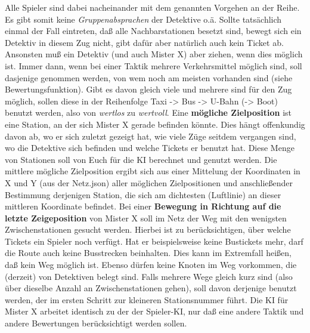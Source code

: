         Alle Spieler sind dabei nacheinander mit dem genannten Vorgehen an der Reihe.
        Es gibt somit keine \textit{Gruppenabsprachen} der Detektive o.ä. Sollte tatsächlich einmal der Fall eintreten, daß alle Nachbarstationen besetzt sind, bewegt sich ein Detektiv in diesem Zug nicht, gibt dafür aber natürlich auch kein Ticket ab.
        Ansonsten muß ein Detektiv (und auch Mister X) aber ziehen, wenn dies möglich ist.
        \newline
        \newline
        Immer dann, wenn bei einer Taktik mehrere Verkehrsmittel möglich sind, soll dasjenige genommen werden, von wem noch am meisten vorhanden sind (siehe Bewertungsfunktion).
        Gibt es davon gleich viele und mehrere sind für den Zug möglich, sollen diese in der Reihenfolge Taxi -> Bus -> U-Bahn (-> Boot) benutzt werden, also von \textit{wertlos} zu \textit{wertvoll}. 
        \newline
        \newline
        Eine \textbf{mögliche Zielposition} ist eine Station, an der sich Mister X gerade befinden könnte.
        Dies hängt offenkundig davon ab, wo er sich zuletzt gezeigt hat, wie viele Züge seitdem vergangen sind, wo die Detektive sich befinden und welche Tickets er benutzt hat.
        Diese Menge von Stationen soll von Euch für die KI berechnet und genutzt werden. Die mittlere mögliche Zielposition ergibt sich aus einer Mittelung der Koordinaten in X und Y (aus der Netz.json) aller möglichen Zielpositionen und anschließender Bestimmung derjenigen Station, die sich am dichtesten (Luftlinie) an dieser mittleren Koordinate befindet. 
        \newline
        \newline
        Bei einer \textbf{Bewegung in Richtung auf die letzte Zeigeposition} von Mister X soll im Netz der Weg mit den wenigsten Zwischenstationen gesucht werden.
        Hierbei ist zu berücksichtigen, über welche Tickets ein Spieler noch verfügt. Hat er beispielsweise keine Bustickets mehr, darf die Route auch keine Busstrecken beinhalten. Dies kann im Extremfall heißen, daß kein Weg möglich ist.
        Ebenso dürfen keine Knoten im Weg vorkommen, die (derzeit) von Detektiven belegt sind. Falls mehrere Wege gleich kurz sind (also über dieselbe Anzahl an Zwischenstationen gehen), soll davon derjenige benutzt werden, der im ersten Schritt zur kleineren Stationsnummer führt. 
        \newline
        \newline
        Die KI für Mister X arbeitet identisch zu der der Spieler-KI, nur daß eine andere Taktik und andere Bewertungen berücksichtigt werden sollen.
